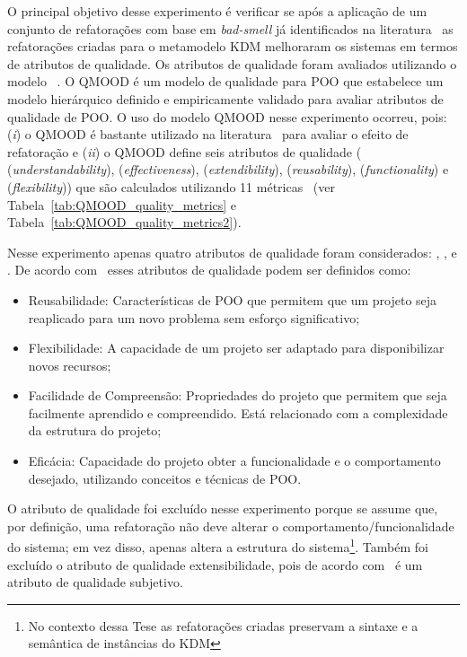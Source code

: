 O principal objetivo desse experimento é verificar se após a aplicação de um conjunto de refatorações com base em \textit{bad-smell} já identificados na literatura~\cite{Kessentini_2011, Ouni_2013, Moha_2010, Kessentini_2010} as refatorações criadas para o metamodelo KDM melhoraram os sistemas em termos de atributos de qualidade. Os atributos de qualidade foram avaliados utilizando o modelo ~\cite{Bansiya_QMOOD}. O QMOOD é um modelo de qualidade para POO que estabelece um modelo hierárquico definido e empiricamente validado para avaliar atributos de qualidade de POO. O uso do modelo QMOOD nesse experimento ocorreu, pois: (\textit{i}) o QMOOD é bastante utilizado na literatura~\cite{Keeffe_2008, Seng_2006, Jensen_2010} para avaliar o efeito de refatoração e (\textit{ii}) o QMOOD define seis atributos de qualidade ( (\textit{understandability}),  (\textit{effectiveness}),  (\textit{extendibility}),  (\textit{reusability}),  (\textit{functionality}) e  (\textit{flexibility})) que são calculados utilizando 11 métricas~\cite{Bansiya_QMOOD} (ver Tabela~\ref{tab:QMOOD_quality_metrics} e Tabela~\ref{tab:QMOOD_quality_metrics2}). 


Nesse experimento apenas quatro atributos de qualidade foram considerados: , ,  e . De acordo com~ esses atributos de qualidade podem ser definidos como: 

\begin{itemize}
\item Reusabilidade: Características de POO que permitem que um projeto seja reaplicado para um novo problema sem esforço significativo;
\item Flexibilidade: A capacidade de um projeto ser adaptado para disponibilizar novos recursos;
\item Facilidade de Compreensão: Propriedades do projeto que permitem que seja facilmente aprendido e compreendido. Está relacionado com a complexidade da estrutura do projeto;
\item Eficácia: Capacidade do projeto obter a funcionalidade e o comportamento desejado, utilizando conceitos e técnicas de POO.
\end{itemize}

O atributo de qualidade  foi excluído nesse experimento porque se assume que, por definição, uma refatoração não deve alterar o comportamento/funcionalidade do sistema; em vez disso, apenas altera a estrutura do sistema\footnote{No contexto dessa Tese as refatorações criadas preservam a sintaxe e a semântica de instâncias do KDM}. Também foi excluído o atributo de qualidade extensibilidade, pois de acordo com~ é um atributo de qualidade subjetivo. 


